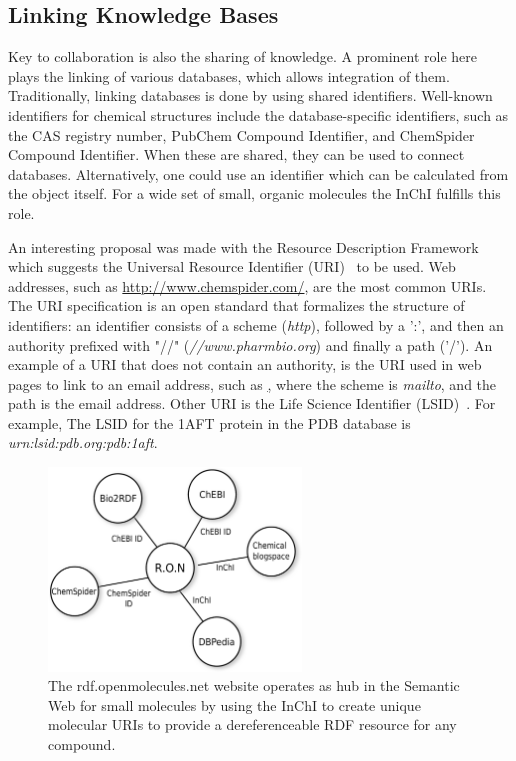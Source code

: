 \documentclass[11pt]{book}
\begin{document}
\subsection{Linking Knowledge Bases}

Key to collaboration is also the sharing of knowledge. A prominent role here
plays the linking of various databases, which allows integration of them.
Traditionally, linking databases is done by using shared identifiers.
Well-known identifiers for chemical structures include the
database-specific identifiers, such as the CAS registry number,
PubChem Compound Identifier, and ChemSpider Compound Identifier.
When these are shared, they can be used to connect databases.
Alternatively, one could use an identifier which can be calculated
from the object itself. For a wide set of small, organic molecules
the InChI fulfills this role.

An interesting proposal was made with the Resource Description
Framework~\cite{Carroll:04:RDF} which suggests the Universal
Resource Identifier (URI)~\cite{rfc3986} to be used.
Web addresses, such as \url{http://www.chemspider.com/}, are
the most common URIs. The URI specification is an open
standard that formalizes the structure of identifiers:
an identifier consists of a scheme (\textit{http}),
followed by a ':', and then an authority prefixed with
"//" (\textit{//www.pharmbio.org}) and
finally a path ('/'). An example of a URI that does not contain an authority,
is the URI used in web pages to link to an email address, such as
\href{mailto:bioclipse-devel@lists.sourceforge.net}, where the
scheme is \textit{mailto}, and the path is the email address.
Other URI is the Life Science Identifier (LSID)~\cite{Clark2004}.
For example, The LSID for the 1AFT protein in the
PDB database is \textit{urn:lsid:pdb.org:pdb:1aft}.

\begin{figure}[bt]
\begin{center}
\includegraphics[width=0.6\textwidth]{graphics/ons.pdf}
\end{center}
\caption{The rdf.openmolecules.net website operates as hub
in the Semantic Web for small molecules by using the InChI
to create unique molecular URIs to provide a dereferenceable
RDF resource for any compound.}
\label{fig:ons}
\end{figure}
\end{document}
